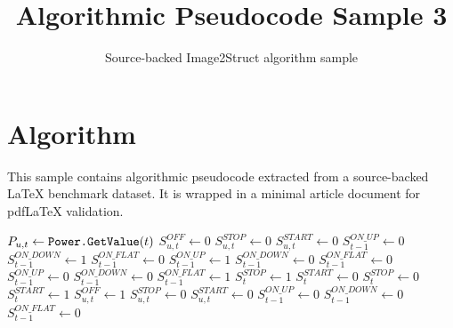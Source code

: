 \documentclass[11pt]{article}
\title{Algorithmic Pseudocode Sample 3}
\author{Source-backed Image2Struct algorithm sample}
\date{}
\begin{document}
\maketitle
\section{Algorithm}
This sample contains algorithmic pseudocode extracted from a source-backed LaTeX benchmark dataset. It is wrapped in a minimal article document for pdfLaTeX validation.

\begin{algorithm}[htbp]
\caption{Source-backed algorithmic procedure}
\begin{algorithm}
[H]
\begin{algorithmic}
\State $P_{u,t}\leftarrow\textrm{{\tt Power.GetValue}}(t)$
\EndFor
{}
\State $S_{u,t}^{OFF} \leftarrow 0$
\State $S_{u,t}^{STOP} \leftarrow 0$
\State $S_{u,t}^{START} \leftarrow 0$
\State $S_{t-1}^{ON\_UP} \leftarrow 0$
\State $S_{t-1}^{ON\_DOWN} \leftarrow 1$
\State $S_{t-1}^{ON\_FLAT} \leftarrow 0$
\State $S_{t-1}^{ON\_UP} \leftarrow 1$
\State $S_{t-1}^{ON\_DOWN} \leftarrow 0$
\State $S_{t-1}^{ON\_FLAT} \leftarrow 0$
\State $S_{t-1}^{ON\_UP} \leftarrow 0$
\State $S_{t-1}^{ON\_DOWN} \leftarrow 0$
\State $S_{t-1}^{ON\_FLAT} \leftarrow 1$
\EndIf
{}
\State $S_{t}^{STOP} \leftarrow 1$
\State $S_{t}^{START} \leftarrow 0$
\Else
\State $S_{t}^{STOP} \leftarrow 0$
\State $S_{t}^{START} \leftarrow 1$
\EndIf
\Else{}
\State $S_{u,t}^{OFF} \leftarrow 1$
\State $S_{u,t}^{STOP} \leftarrow 0$
\State $S_{u,t}^{START} \leftarrow 0$
\State $S_{t-1}^{ON\_UP} \leftarrow 0$
\State $S_{t-1}^{ON\_DOWN} \leftarrow 0$
\State $S_{t-1}^{ON\_FLAT} \leftarrow 0$
\EndIf
\EndFor
\end{algorithmic}
\caption{Initialization of the control and state variables}\end{algorithm}
\end{algorithm}
\end{document}
